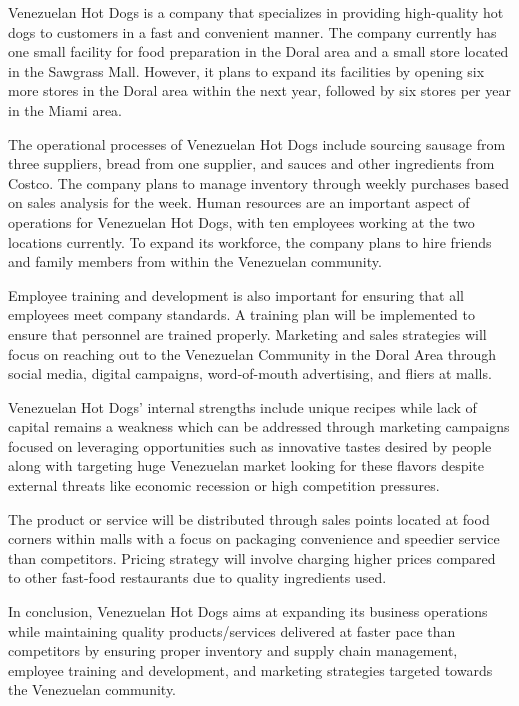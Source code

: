 Venezuelan Hot Dogs is a company that specializes in providing high-quality hot dogs to customers in a fast and convenient manner. The company currently has one small facility for food preparation in the Doral area and a small store located in the Sawgrass Mall. However, it plans to expand its facilities by opening six more stores in the Doral area within the next year, followed by six stores per year in the Miami area.

The operational processes of Venezuelan Hot Dogs include sourcing sausage from three suppliers, bread from one supplier, and sauces and other ingredients from Costco. The company plans to manage inventory through weekly purchases based on sales analysis for the week. Human resources are an important aspect of operations for Venezuelan Hot Dogs, with ten employees working at the two locations currently. To expand its workforce, the company plans to hire friends and family members from within the Venezuelan community.

Employee training and development is also important for ensuring that all employees meet company standards. A training plan will be implemented to ensure that personnel are trained properly. Marketing and sales strategies will focus on reaching out to the Venezuelan Community in the Doral Area through social media, digital campaigns, word-of-mouth advertising, and fliers at malls.

Venezuelan Hot Dogs' internal strengths include unique recipes while lack of capital remains a weakness which can be addressed through marketing campaigns focused on leveraging opportunities such as innovative tastes desired by people along with targeting huge Venezuelan market looking for these flavors despite external threats like economic recession or high competition pressures.

The product or service will be distributed through sales points located at food corners within malls with a focus on packaging convenience and speedier service than competitors. Pricing strategy will involve charging higher prices compared to other fast-food restaurants due to quality ingredients used.

In conclusion, Venezuelan Hot Dogs aims at expanding its business operations while maintaining quality products/services delivered at faster pace than competitors by ensuring proper inventory and supply chain management, employee training and development, and marketing strategies targeted towards the Venezuelan community.